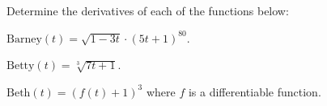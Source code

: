 \begin{problem}
\item Determine the derivatives of each of the functions below:
\begin{subproblem}
  \item ${\displaystyle \mathrm{Barney}(t)=\sqrt{1-3t}\cdot\left( 5t+1 \right)^{80}}$.
    \vfill
  \item ${\displaystyle \mathrm{Betty}(t)=\sqrt[3]{7t+1}}$.
    \vfill
  \item ${\displaystyle \mathrm{Beth}(t)=\left(f(t)+1\right)^3}$
    where $f$ is a differentiable function.
    \vfill
\end{subproblem}
\end{problem}



